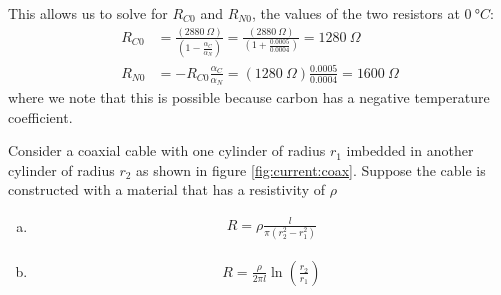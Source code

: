 \begin{solution}
This allows us to solve for $R_{C0}$ and $R_{N0}$, the values of the two resistors at $\SI{0}{\degree C}$:
\begin{align*}
R_{C0}&=\frac{(\SI{2880}{\Omega})}{\left(1-\frac{\alpha_C}{\alpha_N}\right)}=\frac{(\SI{2880}{\Omega})}{\left(1+\frac{\num{0.0005}}{\num{0.0004}}\right)}=\SI{1280}{\Omega}\\
R_{N0}&=-R_{C0}\frac{\alpha_C}{\alpha_N}=(\SI{1280}{\Omega})\frac{\num{0.0005}}{\num{0.0004}}=\SI{1600}{\Omega}
\end{align*}
where we note that this is possible because carbon has a negative temperature coefficient.
\end{solution}

\question Consider a coaxial cable with one cylinder of radius $r_1$ imbedded in another cylinder of radius $r_2$ as shown in figure \ref{fig:current:coax}. Suppose the cable is constructed with a material that has a resistivity of $\rho$
\begin{finalanswer}
\begin{enumerate}[(a)]
\item \begin{align*}
R=\rho\frac{l}{\pi (r_2^2-r_1^2)}
\end{align*}
\item \begin{align*}
R=\frac{\rho}{2\pi l}\ln\left(\frac{r_2}{r_1} \right)
\end{align*}
\end{enumerate}
\end{finalanswer}
